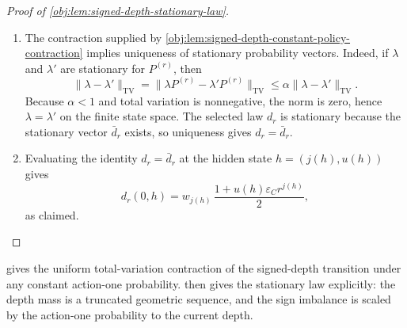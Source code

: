 \documentclass[11pt]{article}
\begin{document}
\begin{proof}[Proof of \cref{obj:lem:signed-depth-stationary-law}]
\begin{enumerate}
\item The contraction supplied by \cref{obj:lem:signed-depth-constant-policy-contraction}
implies uniqueness of stationary probability vectors. Indeed, if \(\lambda\) and
\(\lambda'\) are stationary for \(P^{(r)}\), then
\[
\|\lambda-\lambda'\|_{\mathrm{TV}}
=
\|\lambda P^{(r)}-\lambda'P^{(r)}\|_{\mathrm{TV}}
\le
\alpha\|\lambda-\lambda'\|_{\mathrm{TV}}.
\]
Because \(\alpha<1\) and total variation is nonnegative, the norm is zero, hence
\(\lambda=\lambda'\) on the finite state space. The selected law \(d_r\) is
stationary because the stationary vector \(\bar d_r\) exists, so uniqueness gives
\(d_r=\bar d_r\). %

\item Evaluating the identity \(d_r=\bar d_r\) at the hidden state
\(h=(j(h),u(h))\) gives
\[
d_r(0,h)
=
w_{j(h)}\,\frac{1+u(h)\varepsilon_C r^{j(h)}}{2},
\]
as claimed. %
\end{enumerate}
\end{proof}

 gives the uniform total-variation contraction of the signed-depth transition under any constant action-one probability.  then gives the stationary law explicitly: the depth mass is a truncated geometric sequence, and the sign imbalance is scaled by the action-one probability to the current depth.
\end{document}
